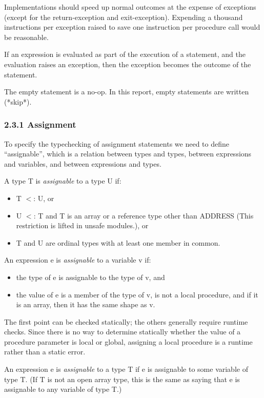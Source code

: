 \documentclass[10pt]{article}
\begin{document}
  Implementations should speed up normal outcomes at the expense of exceptions (except for the return-exception and exit-exception). Expending a thousand instructions per exception raised to save one instruction per procedure call would be reasonable. 


  If an expression is evaluated as part of the execution of a statement, and the evaluation raises an exception, then the exception becomes the outcome of the statement. 


  The empty statement is a no-op. In this report, empty statements are written (*skip*). 


 
\subsubsection*{2.3.1 Assignment}


  To specify the typechecking of assignment statements we need to define ``assignable'', which is a relation between types and types, between expressions and variables, and between expressions and types. 


 A type T is \emph{assignable}
 to a type U if: 
\begin{itemize}
\item T $<$: U, or 
\item U $<$: T and T is an array or a reference type other than ADDRESS (This restriction is lifted in unsafe modules.), or 
\item T and U are ordinal types with at least one member in common. 
\end{itemize}



 An expression e is \emph{assignable}
 to a variable v if: 
\begin{itemize}
\item  the type of e is assignable to the type of v, and 
\item  the value of e is a member of the type of v, is not a local procedure, and if it is an array, then it has the same shape as v. 
\end{itemize}



 The first point can be checked statically; the others generally require runtime checks. Since there is no way to determine statically whether the value of a procedure parameter is local or global, assigning a local procedure is a runtime rather than a static error. 


 An expression e is \emph{assignable}
 to a type T if e is assignable to some variable of type T. (If T is not an open array type, this is the same as saying that e is assignable to any variable of type T.) 
\end{document}
